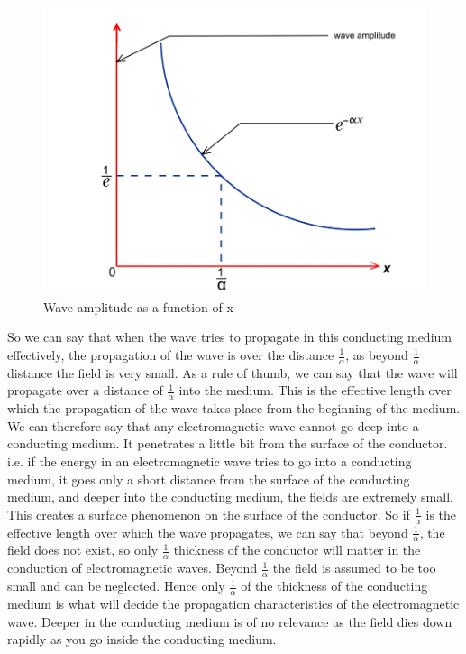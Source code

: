 \begin{figure}[h]
\centering
\includegraphics[width=0.9\linewidth]{graphics/wave_amplitude_as_function_of_x}
\caption{Wave amplitude as a function of x}
\label{fig:bello261}
\end{figure}

So we can say that when the wave tries to propagate in this conducting medium effectively, the propagation of the wave is over the distance $\frac{1}{\alpha}$, as beyond $\frac{1}{\alpha}$ distance the field is very small. As a rule of thumb, we can say that the wave will propagate over a distance of $\frac{1}{\alpha}$ into the medium. This is the effective length over which the propagation of the wave takes place from the beginning of the medium. We can therefore say that any electromagnetic wave cannot go deep into a conducting medium. It penetrates a little bit from the surface of the conductor. i.e. if the energy in an electromagnetic wave tries to go into a conducting medium, it goes only a short distance from the surface of the conducting medium, and deeper into the conducting medium, the fields are extremely small. This creates a surface phenomenon on the surface of the conductor. So if $\frac{1}{\alpha}$  is the effective length over which the wave propagates, we can say that beyond $\frac{1}{\alpha}$, the field does not exist, so only $\frac{1}{\alpha}$ thickness of the conductor will matter in the conduction of electromagnetic waves. Beyond $\frac{1}{\alpha}$  the field is assumed to be too small and can be neglected. Hence only $\frac{1}{\alpha}$ of the thickness of the conducting medium is what will decide the propagation characteristics of the electromagnetic wave. Deeper in the conducting medium is of no relevance as the field dies down rapidly as you go inside the conducting medium.

